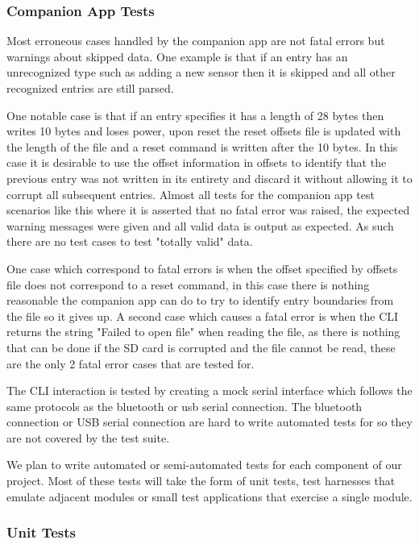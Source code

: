 \subsubsection{Companion App Tests}

Most erroneous cases handled by the companion app are not fatal errors but warnings about skipped data. One example is that if an entry has an unrecognized type such as adding a new sensor then it is skipped and all other recognized entries are still parsed.

One notable case is that if an entry specifies it has a length of 28 bytes then
writes 10 bytes and loses power, upon reset the reset offsets file is updated with 
the length of the file and a reset command is written after the 10 bytes.  
In this case it is desirable to use the offset information in offsets to 
identify that the previous entry was not written in its entirety and discard it without allowing it to corrupt all subsequent entries.  Almost all tests for the companion app test scenarios like this where it is asserted that no fatal error was raised, the expected warning messages were given and all valid data is output as expected. As such there are no test cases to test "totally valid" data.

One case which correspond to fatal errors is when the offset specified by offsets file does not correspond to a reset command, in this case there is nothing reasonable the companion app can do to try to identify entry boundaries from the file so it gives up.  A second case which causes a fatal error is when the CLI returns the string "Failed to open file" when reading the file, as there is nothing that can be done if the SD card is corrupted and the file cannot be read, these are the only 2 fatal error cases that are tested for.

The CLI interaction is tested by creating a mock serial interface which follows the same protocols as the bluetooth or usb serial connection.  The bluetooth connection or USB serial connection are hard to write automated tests for so they are not covered by the test suite.

\iffalse

We plan to write automated or semi-automated tests for each component of our
project. Most of these tests will take the form of unit tests, test harnesses
that emulate adjacent modules or small test applications that exercise a single
module.

\subsubsection{Unit Tests}

